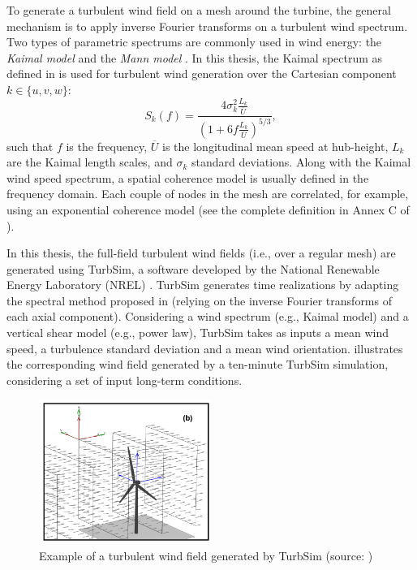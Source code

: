 To generate a turbulent wind field on a mesh around the turbine, the general mechanism is to apply inverse Fourier transforms on a turbulent wind spectrum.  
Two types of parametric spectrums are commonly used in wind energy: the \textit{Kaimal model} \citep{kaimal_1972} and the \textit{Mann model} \citep{mann_1998}. 
In this thesis, the Kaimal spectrum as defined in \cite{iec_2019} is used for turbulent wind generation over the Cartesian component $k \in \{u, v, w\}$:
\begin{equation}
    S_k(f) = \frac{4 \sigma_k^2 \frac{L_k}{\overline{U}}}{\left(1 + 6 f \frac{L_k}{\overline{U}}\right)^{5/3}},
    \label{eq:kaimal}
\end{equation} 
such that $f$ is the frequency, $\overline{U}$ is the longitudinal mean speed at hub-height, $L_k$ are the Kaimal length scales, and $\sigma_k$ standard deviations. 
Along with the Kaimal wind speed spectrum, a spatial coherence model is usually defined in the frequency domain. 
Each couple of nodes in the mesh are correlated, for example, using an exponential coherence model (see the complete definition in Annex C of \citealp{iec_2019}).

In this thesis, the full-field turbulent wind fields (i.e., over a regular mesh) are generated using TurbSim, a software developed by the National Renewable Energy Laboratory (NREL) \citep{turbsim_2009}. 
TurbSim generates time realizations by adapting the spectral method proposed in \citet{veers_1988_sandia} (relying on the inverse Fourier transforms of each axial component).   
Considering a wind spectrum (e.g., Kaimal model) and a vertical shear model (e.g., power law), TurbSim takes as inputs a mean wind speed, a turbulence standard deviation and a mean wind orientation. 
 illustrates the corresponding wind field generated by a ten-minute TurbSim simulation, considering a set of input long-term conditions. 

\begin{figure}
    \centering
    \includegraphics[width=0.5\textwidth]{./part1/figures/turbsim.png}
    \caption{Example of a turbulent wind field generated by TurbSim (source: \citealp{turbsim_2009})}
    \label{fig:turbsim_simu}
\end{figure}

